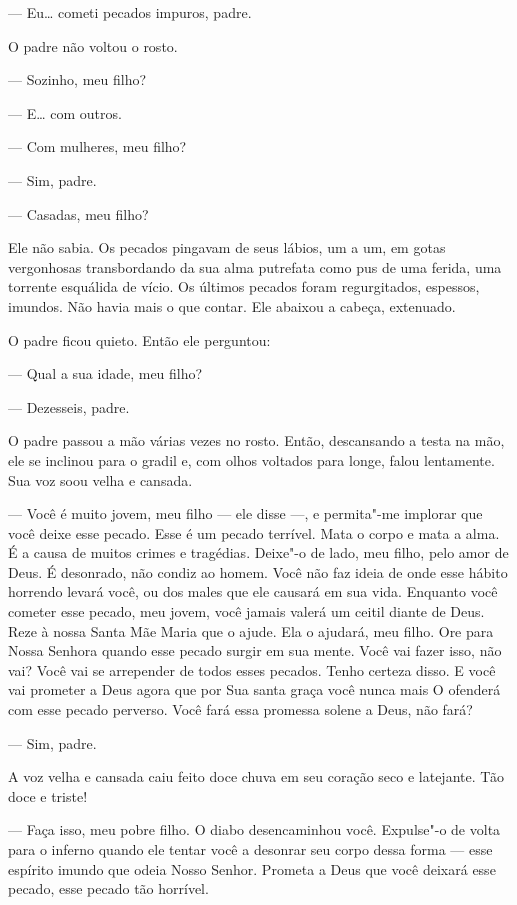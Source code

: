  --- Eu\ldots{} cometi pecados impuros, padre.

O padre não voltou o rosto.

 --- Sozinho, meu filho?

 --- E\ldots{} com outros.

 --- Com mulheres, meu filho?

 --- Sim, padre.

 --- Casadas, meu filho?

Ele não sabia. Os pecados pingavam de seus lábios, um a um, em gotas
vergonhosas transbordando da sua alma putrefata como pus de uma ferida,
uma torrente esquálida de vício. Os últimos pecados foram regurgitados,
espessos, imundos. Não havia mais o que contar. Ele abaixou a cabeça,
extenuado.

O padre ficou quieto. Então ele perguntou:

 --- Qual a sua idade, meu filho?

 --- Dezesseis, padre.

O padre passou a mão várias vezes no rosto. Então, descansando a testa
na mão, ele se inclinou para o gradil e, com olhos voltados para longe,
falou lentamente. Sua voz soou velha e cansada.

 --- Você é muito jovem, meu filho --- ele disse ---, e permita"-me implorar que
você deixe esse pecado. Esse é um pecado terrível. Mata o corpo e mata
a alma. É a causa de muitos crimes e tragédias. Deixe"-o de lado, meu
filho, pelo amor de Deus. É desonrado, não condiz ao homem. Você não
faz ideia de onde esse hábito horrendo levará você, ou dos males que
ele causará em sua vida. Enquanto você cometer esse pecado, meu jovem,
você jamais valerá um ceitil diante de Deus. Reze à nossa Santa Mãe
Maria que o ajude. Ela o ajudará, meu filho. Ore para Nossa Senhora
quando esse pecado surgir em sua mente. Você vai fazer isso, não vai?
Você vai se arrepender de todos esses pecados. Tenho certeza disso. E você
vai prometer a Deus agora que por Sua santa graça você nunca mais O
ofenderá com esse pecado perverso. Você fará essa promessa solene a
Deus, não fará?

 --- Sim, padre.

A voz velha e cansada caiu feito doce chuva em seu coração seco e
latejante. Tão doce e triste!

 --- Faça isso, meu pobre filho. O diabo desencaminhou você. Expulse"-o de
volta para o inferno quando ele tentar você a desonrar seu corpo dessa
forma --- esse espírito imundo que odeia Nosso Senhor. Prometa a Deus que
você deixará esse pecado, esse pecado tão horrível.

